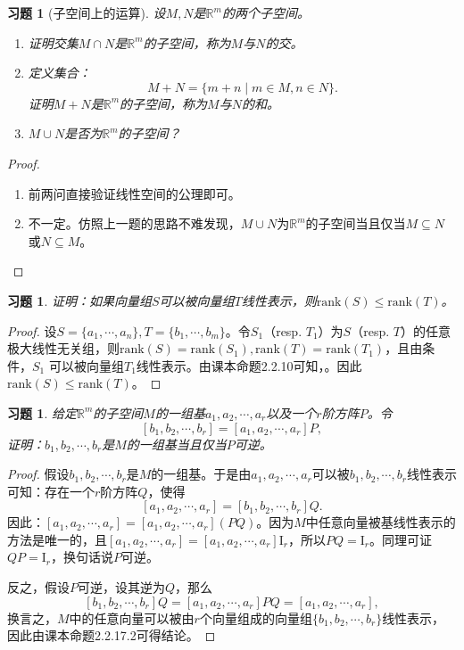 \documentclass[UTF8]{ctexart}
\newtheorem{ex}[thm]{习题}
\begin{document}
\begin{ex}[子空间上的运算]
设$M, N$是$\mathbb{R}^m$的两个子空间。
\begin{enumerate}
\item
证明交集$M \cap N$是$\mathbb{R}^m$的子空间，称为$M$与$N$的交。
\item
定义集合：
\[
M + N = \{m+n \mid m \in M, n \in N\}.
\]
证明$M+N$是$\mathbb{R}^m$的子空间，称为$M$与$N$的和。
\item
$M \cup N$是否为$\mathbb{R}^m$的子空间？
\end{enumerate}
\end{ex}
\begin{proof}
\begin{enumerate}
\item
前两问直接验证线性空间的公理即可。
\item
不一定。仿照上一题的思路不难发现，$M \cup N$为$\mathbb{R}^m$的子空间当且仅当$M \subseteq N$或$N \subseteq M$。
\end{enumerate}
\end{proof}



\begin{ex}
证明：如果向量组$S$可以被向量组$T$线性表示，则$\mathrm{rank}(S) \leq \mathrm{rank}(T)$。
\end{ex}
\begin{proof}
设$S = \{a_1, \cdots, a_n\}, T = \{b_1, \cdots, b_m\}$。令$S_1$（resp. $T_1$）为$S$（resp. $T$）的任意极大线性无关组，则$\mathrm{rank}(S) = \mathrm{rank}(S_1), \mathrm{rank}(T) = \mathrm{rank}(T_1)$，且由条件，$S_1$ 可以被向量组$T_1$线性表示。由课本命题2.2.10可知，。因此$\mathrm{rank}(S) \leq \mathrm{rank}(T)$。
\end{proof}


\begin{ex}
给定$\mathbb{R}^m$的子空间$M$的一组基$a_1, a_2, \cdots, a_r$以及一个$r$阶方阵$P$。令
\[
[b_1, b_2, \cdots, b_r] = [a_1, a_2, \cdots, a_r] P,
\]
证明：$b_1, b_2, \cdots, b_r$是$M$的一组基当且仅当$P$可逆。
\end{ex}
\begin{proof}
假设$b_1, b_2, \cdots, b_r$是$M$的一组基。于是由$a_1, a_2, \cdots, a_r$可以被$b_1, b_2, \cdots, b_r$线性表示可知：存在一个$r$阶方阵$Q$，使得
\[
[a_1, a_2, \cdots, a_r] = [b_1, b_2, \cdots, b_r] Q.
\]
因此：$[a_1, a_2, \cdots, a_r] = [a_1, a_2, \cdots, a_r] (PQ)$。因为$M$中任意向量被基线性表示的方法是唯一的，且$[a_1, a_2, \cdots, a_r] = [a_1, a_2, \cdots, a_r] \mathrm{I}_r$，所以$PQ = \mathrm{I}_r$。同理可证$QP = \mathrm{I}_r$，换句话说$P$可逆。
\

反之，假设$P$可逆，设其逆为$Q$，那么
\[
[b_1, b_2, \cdots, b_r] Q = [a_1, a_2, \cdots, a_r] PQ =  [a_1, a_2, \cdots, a_r],
\]
换言之，$M$中的任意向量可以被由$r$个向量组成的向量组$\{b_1, b_2, \cdots, b_r\}$线性表示，因此由课本命题2.2.17.2可得结论。
\end{proof}
\end{document}
